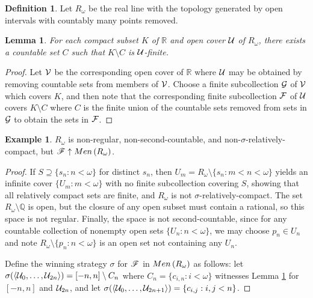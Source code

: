 \documentclass{amsart}
\newtheorem{lemma}[theorem]{Lemma}
\theoremstyle{definition}
\newtheorem{definition}[theorem]{Definition}
\newtheorem{example}[theorem]{Example}
\begin{document}
\begin{definition}
  Let \(R_\omega\) be the real line with the topology generated by open
  intervals with countably many points removed.
\end{definition}

\begin{lemma}\label{rOmegaLemma}
  For each compact subset \(K\) of \(\mathbb R\)
  and open cover \(\mathcal{U}\) of \(R_\omega\),
  there exists a countable set \(C\) such that \(K\setminus C\)
  is \(\mathcal{U}\)-finite.
\end{lemma}

\begin{proof}
  Let \(\mathcal{V}\) be the corresponding open cover of \(\mathbb R\) where
  \(\mathcal{U}\) may be obtained by removing countable sets from members of
  \(\mathcal{V}\). Choose a finite subcollection \(\mathcal{G}\) of \(\mathcal{V}\) which
  covers \(K\), and then note that the corresponding finite subcollection
  \(\mathcal{F}\) of \(\mathcal{U}\) covers \(K\setminus C\) where \(C\) is the
  finite union of the countable sets removed from sets in \(\mathcal{G}\)
  to obtain the sets in \(\mathcal{F}\).
\end{proof}

\begin{example}
  \(R_\omega\) is non-regular, non-second-countable, and
  non-\(\sigma\)-relatively-compact, but \(\mathscr{F}\uparrow Men\left({R_\omega}\right)\).
\end{example}

\begin{proof}
  If \(S\supseteq\{s_n:n<\omega\}\) for distinct \(s_n\),
  then \(U_m=R_\omega\setminus\{s_n:m<n<\omega\}\) yields an
  infinite cover \(\{U_m:m<\omega\}\) with no finite subcollection covering
  \(S\), showing that all relatively compact sets are finite, and \(R_\omega\)
  is not \(\sigma\)-relatively-compact. The set \(R_\omega\setminus\mathbb Q\)
  is open, but the closure of any open subset must contain a rational, so
  this space is not regular. Finally, the space is not second-countable,
  since for any countable collection of nonempty
  open sets \(\{U_n:n<\omega\}\), we may choose \(p_n\in U_n\)
  and note \(R_\omega\setminus\{p_n:n<\omega\}\) is an open set not containing
  any \(U_n\).

  Define the winning strategy \(\sigma\) for \(\mathscr{F}\) in
  \(Men\left({R_\omega}\right)\) as follows: let
  \(\sigma(\langle\mathcal{U}_0,\dots,\mathcal{U}_{2n}\rangle)=[-n,n]\setminus C_n\)
  where \(C_n=\{c_{i,n}:i<\omega\}\)
  witnesses Lemma \ref{rOmegaLemma} for \([-n,n]\)
  and \(\mathcal{U}_{2n}\),
  and let \(\sigma(\langle\mathcal{U}_0,\dots,\mathcal{U}_{2n+1}\rangle)=\{c_{i,j} : i,j < n\}\).
\end{proof}
\end{document}
